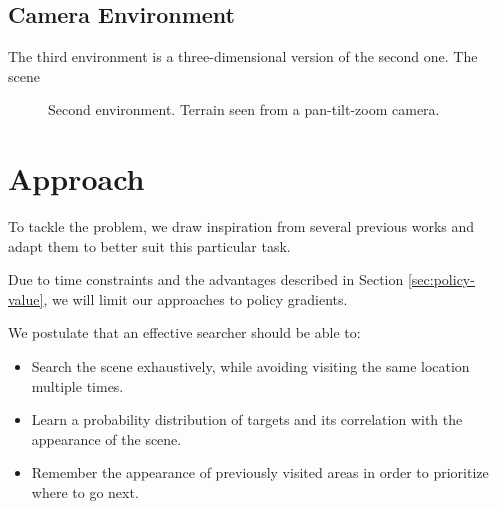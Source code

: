 \subsection{Camera Environment}

The third environment is a three-dimensional version of the second one.
The scene 

\begin{figure}
    \centering
    
    \label{fig:camera}
    \caption[Camera environment]{Second environment. Terrain seen from a pan-tilt-zoom camera.}
\end{figure}

\section{Approach}
\label{sec:approach}

To tackle the problem, we draw inspiration from several previous works and adapt them to better suit this particular task.

Due to time constraints and the advantages described in Section \ref{sec:policy-value}, we will limit our approaches to policy gradients.









We postulate that an effective searcher should be able to:

\begin{itemize}
    \item Search the scene exhaustively, while avoiding visiting the same location multiple times.
    \item Learn a probability distribution of targets and its correlation with the appearance of the scene.
    \item Remember the appearance of previously visited areas in order to prioritize where to go next.
\end{itemize}

